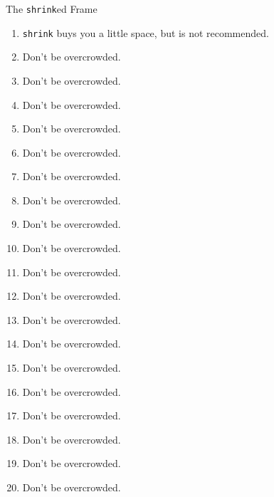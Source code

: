 \documentclass[
        ]{beamer}
\begin{document}
\begin{frame}[shrink]{The \texttt{shrink}ed Frame} %
    \begin{enumerate}
    \item \texttt{shrink} buys you a little space, but is not recommended.
    \item Don't be overcrowded.
    \item Don't be overcrowded.
    \item Don't be overcrowded.
    \item Don't be overcrowded.

    \item Don't be overcrowded.
    \item Don't be overcrowded.
    \item Don't be overcrowded.
    \item Don't be overcrowded.
    \item Don't be overcrowded.
    
    \item Don't be overcrowded.
    \item Don't be overcrowded.
    \item Don't be overcrowded.
    \item Don't be overcrowded.
    \item Don't be overcrowded.
    
    \item Don't be overcrowded.
    \item Don't be overcrowded.
    \item Don't be overcrowded.
    \item Don't be overcrowded.
    \item Don't be overcrowded.
    \end{enumerate}
\end{frame}
\end{document}
